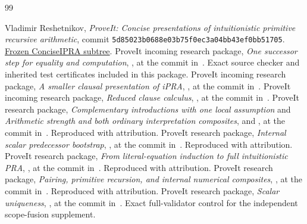 \documentclass[11pt,letterpaper]{article}
\theoremstyle{definition}
\begin{document}
\clearpage
\begin{thebibliography}{99}
\raggedright
{}
Vladimir Reshetnikov, \emph{ProveIt: Concise presentations of
intuitionistic primitive recursive arithmetic}, commit
\texttt{5d85023b0688e03b75f0ec3a04bb43ef0bb51705}.
\href{https://github.com/VladimirReshetnikov/ProveIt/tree/5d85023b0688e03b75f0ec3a04bb43ef0bb51705/Logic/PrimitiveRecursiveArithmetic/ConciseIPRA}{Frozen ConciseIPRA subtree}.
ProveIt incoming research package, \emph{One successor step for equality
and computation}, , at the
commit in~\cite{baseline}. Exact source checker and inherited test
certificates included in this package.
ProveIt incoming research package, \emph{A smaller clausal presentation
of iPRA}, , at
the commit in~\cite{baseline}.
ProveIt incoming research package, \emph{Reduced clause calculus},
, at the
commit in~\cite{baseline}.
ProveIt research package, \emph{Complementary introductions with one
local assumption} and \emph{Arithmetic strength and both ordinary
interpretation composites},
and , at the commit in~\cite{baseline}.
Reproduced with attribution.
ProveIt research package, \emph{Internal scalar predecessor bootstrap},
, at the
commit in~\cite{baseline}. Reproduced with attribution.
ProveIt research package, \emph{From literal-equation induction to full
intuitionistic PRA},
, at
the commit in~\cite{baseline}. Reproduced with attribution.
ProveIt research package, \emph{Pairing, primitive recursion, and internal
numerical composites},
, at
the commit in~\cite{baseline}. Reproduced with attribution.
ProveIt research package, \emph{Scalar uniqueness},
, at the
commit in~\cite{baseline}. Exact full-validator control for the independent
scope-fusion supplement.
\end{thebibliography}
\end{document}
